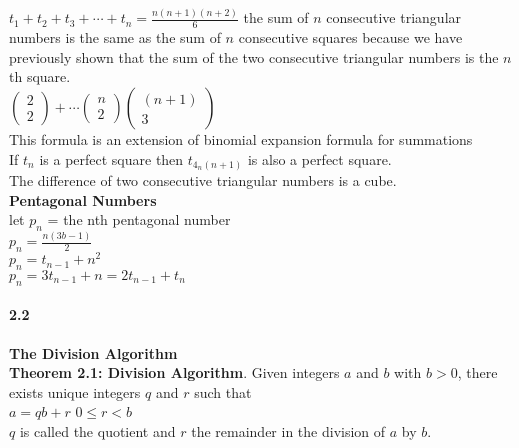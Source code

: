 \documentclass[14pt]{extreport}
\begin{document}
$t_1 + t_2 + t_3 + \cdots  + t_n = \frac{n(n+1)(n+2)}{6}$ the sum of $n$ consecutive triangular numbers is the same as the sum of $n$ consecutive squares because we have previously shown that the sum of the two consecutive triangular numbers is the $n$th square.\\

$\begin{pmatrix} 2 \\ 2 \end{pmatrix} + \cdots \begin{pmatrix} n \\ 2 \end{pmatrix} \begin{pmatrix} (n+1) \\ 3\end{pmatrix}$ \\
This formula is an extension of binomial expansion formula for summations\\

If $t_n$ is a perfect square then $t_{4_n(n+1)}$ is also a perfect square.\\

The difference of two consecutive triangular numbers is a cube.\\

\textbf{Pentagonal Numbers}\\
let $p_n$ = the nth pentagonal number\\

$p_n = \frac{n(3b-1)}{2}$\\

$p_n = t_{n-1} + n^2$\\

$p_n = 3t_{n-1} + n = 2t_{n-1} + t_n$\\

\paragraph{2.2} \textbf{The Division Algorithm}\\

\textbf{Theorem 2.1: Division Algorithm}. Given integers $a$ and $b$ with $b > 0$, there exists unique integers $q$ and $r$ such that\\
$a = qb + r$   $0 \le r < b$\\
$q$ is called the quotient and $r$ the remainder in the division of $a$ by $b$.\\\\
\end{document}
